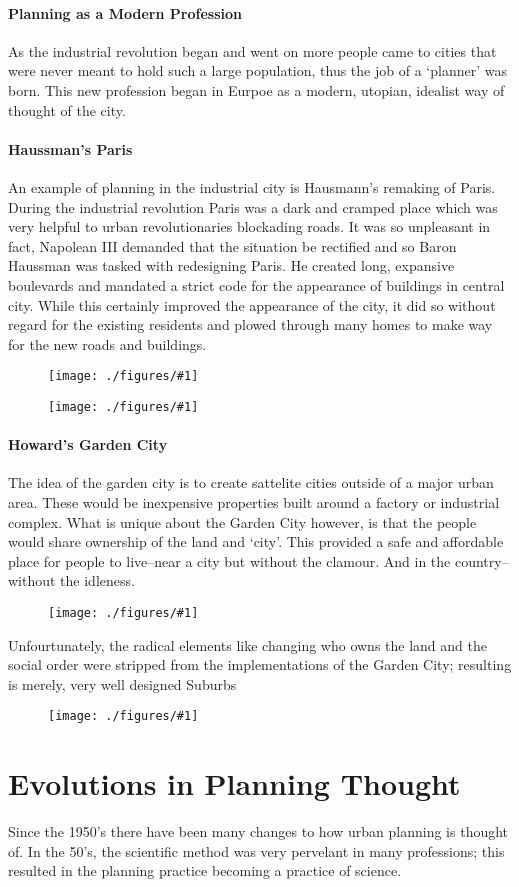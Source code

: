 \documentclass[12pt]{book}
\newcommand{\incimg}[2]{%
       \begin{figure}[h]
               \centering
               \texttt{[image: ./figures/\#1]}
       \end{figure}
}
\begin{document}
\paragraph{Planning as a Modern Profession}
As the industrial revolution began and went on more people came to cities that were
never meant to hold such a large population, thus the job of a `planner' was born. 
This new profession began in Eurpoe as a modern, utopian, idealist way of thought
of the city.
\pagebreak

\paragraph{Haussman's Paris}
An example of planning in the industrial city is Hausmann's remaking of Paris. 
During the industrial revolution Paris was a dark and cramped place which was 
very helpful to urban revolutionaries blockading roads. It was so 
unpleasant in fact, Napolean III demanded that the situation be rectified and so 
Baron Haussman was tasked with redesigning Paris. He created long, expansive
boulevards and mandated a strict code for the appearance of buildings in 
central city. While this certainly improved the appearance of the city, it did
so without regard for the existing residents and plowed through many homes to make
way for the new roads and buildings.
\incimg{paris}{0.4}
\incimg{parismap}{0.6}

\paragraph{Howard's Garden City}
The idea of the garden city is to create sattelite cities outside of a major urban area.
These would be inexpensive properties built around a factory or industrial complex.
What is unique about the Garden City however, is that the people would share 
ownership of the land and `city'. This provided a safe and affordable place for
people to live--near a city but without the clamour. And in the country--without the 
idleness.
\incimg{gardencity}{0.4}

Unfourtunately, the radical elements like changing who owns the land and the social 
order were stripped from the implementations of the Garden City; resulting is merely,
very well designed Suburbs
\incimg{hampstead}{0.4}

\section*{Evolutions in Planning Thought}
Since the 1950's there have been many changes to how urban planning is thought of.
In the 50's, the scientific method was very pervelant in many professions; this
resulted in the planning practice becoming a practice of science.
\end{document}
